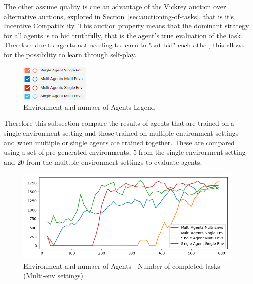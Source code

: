 The other assume quality is due an advantage of the Vickrey auction over alternative auctions, explored in
Section~\ref{sec:auctioning-of-tasks}, that is it's Incentive Compatibility. This auction property means that the
dominant strategy for all agents is to bid truthfully, that is the agent's true evaluation of the task. Therefore due
to agents not needing to learn to "out bid" each other, this allows for the possibility to learn through self-play.

\begin{figure}
    \includegraphics[width=0.3\textwidth]{figures/5_evaluation_figs/env_agent_num_training_fig/legend.png}
    \caption{Environment and number of Agents Legend}
    \label{fig:env-training-legend}
\end{figure}

Therefore this subsection compare the results of agents that are trained on a single environment setting and those
trained on multiple environment settings and when multiple or single agents are trained together. These are compared
using a set of pre-generated environments, 5 from the single environment setting and 20 from the multiple
environment settings to evaluate agents.

\begin{figure}[H]
    \centering
    \includegraphics[width=\linewidth]{figures/5_evaluation_figs/env_agent_num_training_fig/num_completed_tasks.png}
    \caption{Environment and number of Agents - Number of completed tasks (Multi-env settings)}
    \label{fig:env_num_completed_tasks}
\end{figure}

